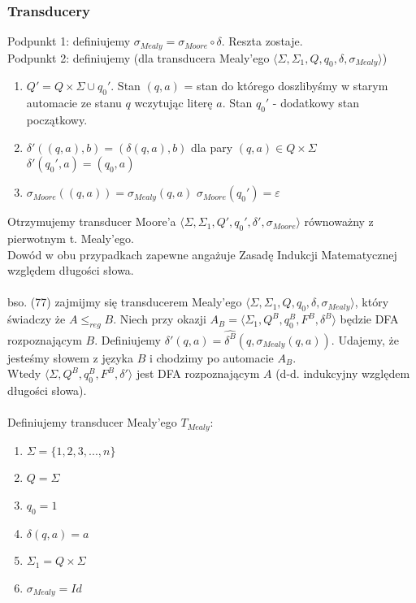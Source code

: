 \documentclass[a4paper,11pt]{article}
\newenvironment{zadanie}[1]
  {\renewcommand\theinnercustomthm{#1}\innercustomthm}
  {\endinnercustomthm}
\begin{document}
\subsubsection{Transducery}

\begin{zadanie}{77}
\end{zadanie}
Podpunkt 1: definiujemy $\sigma_{Mealy} = \sigma_{Moore} \circ \delta$. Reszta zostaje.\\
Podpunkt 2: definiujemy (dla transducera Mealy'ego $\langle \Sigma, \Sigma_1, Q, q_0, \delta, \sigma_{Mealy} \rangle$)
\begin{enumerate}
 \item $Q' = Q \times \Sigma \cup q_0'$. Stan $(q,a)$ = stan do którego doszlibyśmy w starym automacie ze stanu $q$ wczytując
 literę $a$. Stan $q_0'$ - dodatkowy stan początkowy.
 \item 
 \subitem $\delta'((q,a),b) = (\delta(q,a),b)$ dla pary $(q,a) \in Q \times \Sigma$
 \subitem $\delta'(q_0',a) = (q_0,a)$
 \item
 \subitem $\sigma_{Moore}((q,a)) = \sigma_{Mealy}(q,a)$
 \subitem $\sigma_{Moore}(q_0') = \varepsilon$
\end{enumerate}
Otrzymujemy transducer Moore'a $\langle \Sigma, \Sigma_1, Q', q_0', \delta', \sigma_{Moore} \rangle$ równoważny z pierwotnym
t. Mealy'ego. \\
Dowód w obu przypadkach zapewne angażuje Zasadę Indukcji Matematycznej względem długości słowa. \\ \\ 

\begin{zadanie}{78}
\end{zadanie}
bso. (77) zajmijmy się transducerem Mealy'ego $\langle \Sigma, \Sigma_1, Q, q_0, \delta, \sigma_{Mealy} \rangle$, który 
świadczy że $A \leqslant_{reg}B$. Niech przy okazji $A_B = \langle \Sigma_1, Q^B, q_0^B, F^B, \delta^B\rangle$ będzie DFA
rozpoznającym $B$. Definiujemy $\delta'(q,a) = \widehat{\delta^B}(q,\sigma_{Mealy}(q,a))$. Udajemy, że jesteśmy słowem z języka
$B$ i chodzimy po automacie $A_B$.\\
Wtedy $\langle \Sigma, Q^B, q_0^B, F^B, \delta' \rangle$ jest DFA rozpoznającym $A$ (d-d. indukcyjny względem długości słowa). \\ \\

\begin{zadanie}{79}
\end{zadanie}
Definiujemy transducer Mealy'ego $T_{Mealy}$:
\begin{enumerate}
 \item $\Sigma = \{1,2,3,...,n\}$
 \item $Q = \Sigma$
 \item $q_0 = 1$
 \item $\delta(q,a) = a$
 \item $\Sigma_1 = Q \times \Sigma$
 \item $\sigma_{Mealy} = Id$
\end{enumerate}
\end{document}
